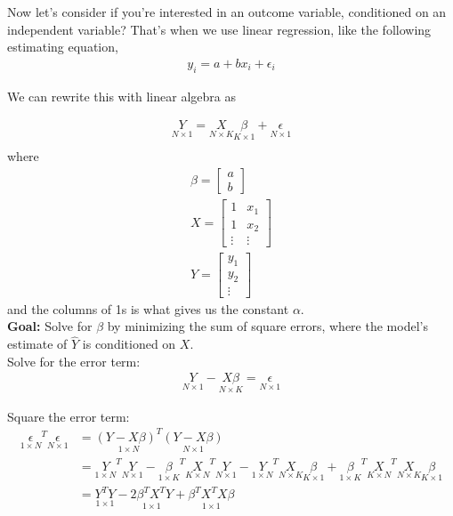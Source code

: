 \documentclass{article}
\begin{document}
Now let's consider if you're interested in an outcome variable, conditioned on an independent variable? That's when we use linear regression, like the following estimating equation,
\begin{align}
    y_i = a + bx_i + \epsilon_i
\end{align}

We can rewrite this with linear algebra as

\begin{align}
    \underset{N \times 1} Y = \underset{N \times K } X 
                              \underset{K \times 1} \beta +  \underset{ N \times 1} \epsilon\\
\end{align} 
where 
\begin{align}
    \beta = \begin{bmatrix}
        a\\
        b
    \end{bmatrix}\\
    X = \begin{bmatrix}
        1 & x_1\\
        1 & x_2\\
        \vdots & \vdots
    \end{bmatrix}\\
    Y = \begin{bmatrix}
        y_1\\
        y_2\\
        \vdots
    \end{bmatrix}
\end{align}
and the columns of 1s is what gives us the constant $\alpha$.\\

\textbf{Goal:} Solve for $\beta$ by minimizing the sum of square errors, where the model's estimate of $\hat Y$ is conditioned on $X$. \\

Solve for the error term:
\begin{align}
    \underset{N \times 1} Y - \underset{N \times K}{X \beta} = \underset{N \times 1} \epsilon
\end{align}

Square the error term:
\begin{align}
    \underset{1 \times N} \epsilon^T  \underset{N \times 1}\epsilon &= 
        \underset{1 \times N}{(Y - X \beta)^T} \underset{N \times 1}{(Y - X \beta)} \\
    &= \underset{1 \times N}Y^T \underset{N \times 1} Y - \underset{1 \times K} \beta^T \underset{K \times N} X^T \underset{N \times 1} Y - \underset{1 \times N} Y^T \underset{N \times K} X \underset{K \times 1}\beta + \underset{1 \times K}\beta^T \underset{K \times N}X^T \underset{N \times K}X \underset{K \times 1}\beta\\
    &= \underset{1 \times 1}{Y^T Y} - \underset{1 \times 1}{2 \beta^T X^T Y} + \underset{1 \times 1}{\beta^T X^T X \beta}
\end{align}
\end{document}
